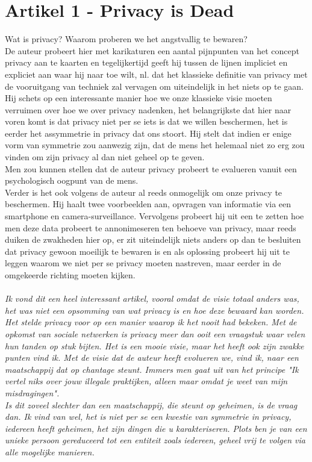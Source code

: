 \documentclass[11pt,a4paper]{article}
\author{Arya Ghodsi}
\begin{document}

\newpage

\section*{Artikel 1 - Privacy is Dead}
Wat is privacy? Waarom proberen we het angstvallig te bewaren? \\ 
De auteur probeert hier met karikaturen een aantal pijnpunten van het concept privacy aan te kaarten en tegelijkertijd geeft hij tussen de lijnen impliciet en expliciet aan waar hij naar toe wilt, nl. dat het klassieke definitie van privacy met de vooruitgang van techniek zal vervagen om uiteindelijk in het niets op te gaan. \\ Hij schets op een interessante manier hoe we onze klassieke visie moeten verruimen over hoe we over privacy nadenken, het belangrijkste dat hier naar voren komt is  dat privacy niet per se iets is dat we willen beschermen, het is eerder het assymmetrie in privacy dat ons stoort. Hij stelt dat indien er enige vorm van symmetrie zou aanwezig zijn, dat de mens het helemaal niet zo erg zou vinden om zijn privacy al dan niet geheel op te geven.\\ Men zou kunnen stellen dat de auteur privacy probeert te evalueren vanuit een psychologisch oogpunt van de mens.\\ Verder is het ook volgens de auteur al reeds onmogelijk om onze privacy te beschermen. Hij haalt twee voorbeelden aan, opvragen van informatie via een smartphone en camera-surveillance. Vervolgens probeert hij uit een te zetten hoe men deze data probeert te annonimeseren ten behoeve van privacy, maar reeds duiken de zwakheden hier op, er zit uiteindelijk niets anders op dan te besluiten dat privacy gewoon moeilijk te bewaren is en als oplossing probeert hij uit te leggen waarom we niet per se privacy moeten nastreven, maar eerder in de omgekeerde richting moeten kijken.\\
\\
\textit{Ik vond dit een heel interessant artikel, vooral omdat de visie totaal anders was, het was niet een opsomming van wat privacy is en hoe deze bewaard kan worden. Het stelde privacy voor op een manier waarop ik het nooit had bekeken. Met de opkomst van sociale netwerken is privacy meer dan ooit een vraagstuk waar velen hun tanden op stuk bijten. Het is een mooie visie, maar het heeft ook zijn zwakke punten vind ik. Met de visie dat de auteur heeft evolueren we, vind ik, naar een maatschappij dat op chantage steunt. Immers men gaat uit van het principe "Ik vertel niks over jouw illegale praktijken, alleen maar omdat je weet van mijn misdragingen". \\
Is dit zoveel slechter dan een maatschappij, die steunt op geheimen, is de vraag dan. Ik vind van wel, het is niet per se een kwestie van symmetrie in privacy, iedereen heeft geheimen, het zijn dingen die u karakteriseren. Plots ben je van een unieke persoon gereduceerd tot een entiteit zoals iedereen, geheel vrij te volgen via alle mogelijke manieren.}
\newpage
\end{document}
